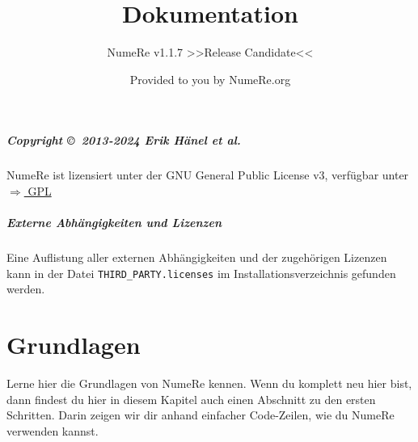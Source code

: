 \documentclass[DIV=17, parskip=half]{scrreprt}
\title{Dokumentation}
\subtitle{NumeRe v1.1.7 >>Release Candidate<<}
\date{}
\author{\small Provided to you by NumeRe.org}
\begin{document}
    \maketitle
% 
% 
	\tableofcontents
		\paragraph{Copyright \copyright\ 2013-2024 Erik H\"anel \emph{et al.}} 
		NumeRe ist lizensiert unter der GNU General Public License v3, verf\"ugbar unter \href{http://www.gnu.org/licenses/gpl.html}{$\Rightarrow$ GPL}
		\paragraph{Externe Abh\"angigkeiten und Lizenzen} Eine Auflistung aller externen Abh\"angigkeiten und der zugeh\"origen Lizenzen kann in der Datei \verb!THIRD_PARTY.licenses! im Installationsverzeichnis gefunden werden.
	\chapter{Grundlagen}
		Lerne hier die Grundlagen von NumeRe kennen. Wenn du komplett neu hier bist, dann findest du hier in diesem Kapitel auch einen Abschnitt zu den ersten Schritten. Darin zeigen wir dir anhand einfacher Code-Zeilen, wie du NumeRe verwenden kannst.
		
		
		
		
		
		
		
		
		
		
	
\end{document}

